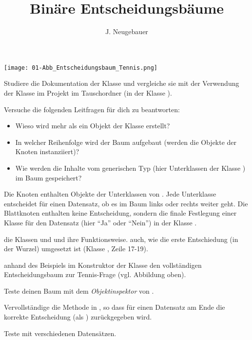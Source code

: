 \documentclass[10pt, a4paper]{scrartcl}
\author{J. Neugebauer}
\title{Binäre Entscheidungsbäume}
\date{\Heute}
\begin{document}
\ReiheTitel

\begin{center}
	\texttt{[image: 01-Abb\_Entscheidungsbaum\_Tennis.png]}
\end{center}

\begin{aufgabe}
	Studiere die Dokumentation der Klasse  und vergleiche sie mit der Verwendung der Klasse im Projekt  im Tauschordner (in der Klasse ).

	Versuche die folgenden Leitfragen für dich zu beantworten:
	\begin{itemize}
		\item Wieso wird mehr als ein Objekt der Klasse  erstellt?
		\item In welcher Reihenfolge wird der Baum aufgebaut (werden die Objekte der Knoten instanziiert)?
		\item Wie werden die Inhalte vom generischen Typ  (hier Unterklassen der Klasse ) im Baum gespeichert?
	\end{itemize}
\end{aufgabe}

\begin{aufgabe}
	Die Knoten enthalten Objekte der Unterklassen von . Jede Unterklasse entscheidet für einen Datensatz, ob es im Baum links oder rechts weiter geht. Die Blattknoten enthalten keine Entscheidung, sondern die finale Festlegung einer Klasse für den Datensatz (hier \enquote{Ja} oder \enquote{Nein}) in der Klasse .

	 die Klassen  und  und  ihre Funktionsweise.  auch, wie die erste Entschiedung (in der Wurzel) umgesetzt ist (Klasse , Zeile 17-19).
\end{aufgabe}

\begin{aufgabe}
	 anhand des Beispiels im Konstruktor der Klasse  den vollständigen Entscheidungsbaum zur Tennis-Frage (vgl. Abbildung oben).

	Teste deinen Baum mit dem \emph{Objektinspektor} von .
\end{aufgabe}

\begin{aufgabe}
	Vervollständige die Methode  in , so dass für einen Datensatz am Ende die korrekte Entscheidung (als ) zurückgegeben wird.

	Teste mit verschiedenen Datensätzen.
\end{aufgabe}
\end{document}
